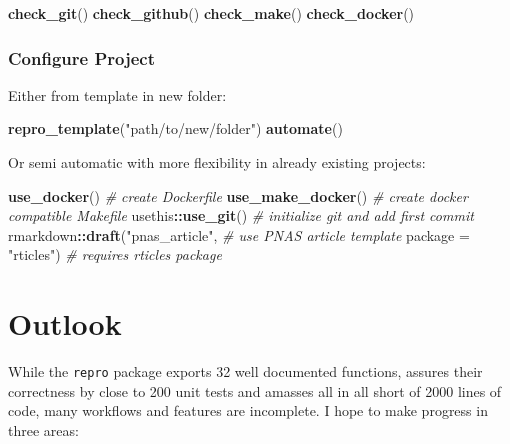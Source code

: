 \documentclass[12pt,a4paper,]{article}
\newenvironment{Shaded}{\begin{snugshade}}{\end{snugshade}}
\newcommand{\CommentTok}[1]{\textcolor[rgb]{0.56,0.35,0.01}{\textit{#1}}}
\newcommand{\DataTypeTok}[1]{\textcolor[rgb]{0.13,0.29,0.53}{#1}}
\newcommand{\KeywordTok}[1]{\textcolor[rgb]{0.13,0.29,0.53}{\textbf{#1}}}
\newcommand{\NormalTok}[1]{#1}
\newcommand{\OperatorTok}[1]{\textcolor[rgb]{0.81,0.36,0.00}{\textbf{#1}}}
\newcommand{\StringTok}[1]{\textcolor[rgb]{0.31,0.60,0.02}{#1}}
\begin{document}
\begin{Shaded}
\begin{Highlighting}[]
\KeywordTok{check_git}\NormalTok{()}
\KeywordTok{check_github}\NormalTok{()}
\KeywordTok{check_make}\NormalTok{()}
\KeywordTok{check_docker}\NormalTok{()}
\end{Highlighting}
\end{Shaded}

\hypertarget{configure-project}{%
\subsubsection{Configure Project}\label{configure-project}}

Either from template in new folder:

\begin{Shaded}
\begin{Highlighting}[]
\KeywordTok{repro_template}\NormalTok{(}\StringTok{"path/to/new/folder"}\NormalTok{)}
\KeywordTok{automate}\NormalTok{()}
\end{Highlighting}
\end{Shaded}

Or semi automatic with more flexibility in already existing projects:

\begin{Shaded}
\begin{Highlighting}[]
\KeywordTok{use_docker}\NormalTok{() }\CommentTok{# create Dockerfile}
\KeywordTok{use_make_docker}\NormalTok{() }\CommentTok{# create docker compatible Makefile}
\NormalTok{usethis}\OperatorTok{::}\KeywordTok{use_git}\NormalTok{() }\CommentTok{# initialize git and add first commit}
\NormalTok{rmarkdown}\OperatorTok{::}\KeywordTok{draft}\NormalTok{(}\StringTok{"pnas_article"}\NormalTok{, }\CommentTok{# use PNAS article template}
                 \DataTypeTok{package =} \StringTok{"rticles"}\NormalTok{) }\CommentTok{# requires rticles package}
\end{Highlighting}
\end{Shaded}

\hypertarget{outlook}{%
\section{Outlook}\label{outlook}}

While the \texttt{repro} package exports 32 well documented functions, assures their correctness by close to 200 unit tests and amasses all in all short of 2000 lines of code, many workflows and features are incomplete.
I hope to make progress in three areas:
\end{document}
